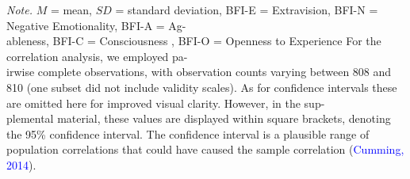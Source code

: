 \documentclass[
  man,floatsintext]{apa7}
\newenvironment{lltable}{\begin{landscape}\centering\begin{ThreePartTable}}{\end{ThreePartTable}\end{landscape}}
\begin{document}
\begin{lltable}

\begin{TableNotes}[para]
\normalsize{\textit{Note.} {\justifying}$M$ = mean, $SD$ = standard deviation, BFI-E = Extravision,  BFI-N = Negative Emotionality, BFI-A = Ag- \\ableness,  BFI-C = Consciousness ,  BFI-O = Openness to Experience For the correlation analysis, we employed pa-\\irwise complete observations, with observation counts varying between 808 and 810 (one subset did not include validity scales). As for confidence intervals these are omitted here for improved visual clarity. However, in the sup- \\plemental material, these values are displayed within square brackets, denoting the 95\% confidence interval. The confidence interval is a plausible range of population correlations that could have caused the sample correlation ({\textcolor{blue}{Cumming, 2014}}).}
\end{TableNotes}

\footnotesize{

}
\end{lltable}
\end{document}
